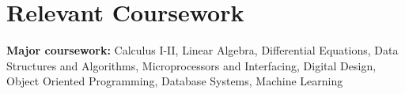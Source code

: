 \documentclass[letterpaper,11pt]{article}
\makeatletter
\newcommand{\resumeOrganizationHeading}[4]{
  \vspace{-2pt}\item
    \begin{tabular*}{0.97\textwidth}[t]{l@{\extracolsep{\fill}}r}
      \textbf{#1} & \textit{\small #2} \\
      \textit{\small#3}
    \end{tabular*}\vspace{-7pt}
}
\newcommand{\resumeSubHeadingListStart}{\begin{itemize}[leftmargin=0.15in, label={}]}
\newcommand{\resumeSubHeadingListEnd}{\end{itemize}}
\makeatother
\begin{document}

\section{Relevant Coursework}
\vspace{2pt}
\resumeSubHeadingListStart
\small{\item{
	            \textbf{Major coursework:}{ Calculus I-II, Linear Algebra, Differential Equations, Data Structures and Algorithms, Microprocessors and Interfacing, Digital Design, Object Oriented Programming, Database Systems, Machine Learning} \\ \vspace{3pt}
	      }}
\resumeSubHeadingListEnd









\end{document}
